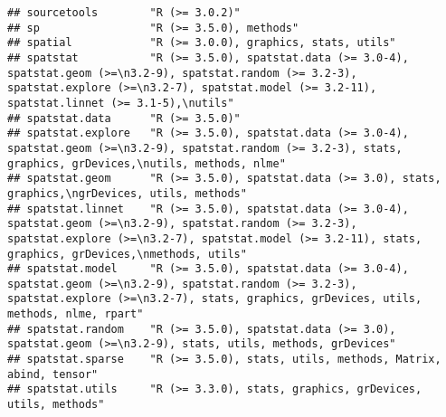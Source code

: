 \documentclass[
]{article}
\begin{document}
\begin{verbatim}
## sourcetools        "R (>= 3.0.2)"                                                                                                                                                                                        
## sp                 "R (>= 3.5.0), methods"                                                                                                                                                                               
## spatial            "R (>= 3.0.0), graphics, stats, utils"                                                                                                                                                                
## spatstat           "R (>= 3.5.0), spatstat.data (>= 3.0-4), spatstat.geom (>=\n3.2-9), spatstat.random (>= 3.2-3), spatstat.explore (>=\n3.2-7), spatstat.model (>= 3.2-11), spatstat.linnet (>= 3.1-5),\nutils"         
## spatstat.data      "R (>= 3.5.0)"                                                                                                                                                                                        
## spatstat.explore   "R (>= 3.5.0), spatstat.data (>= 3.0-4), spatstat.geom (>=\n3.2-9), spatstat.random (>= 3.2-3), stats, graphics, grDevices,\nutils, methods, nlme"                                                    
## spatstat.geom      "R (>= 3.5.0), spatstat.data (>= 3.0), stats, graphics,\ngrDevices, utils, methods"                                                                                                                   
## spatstat.linnet    "R (>= 3.5.0), spatstat.data (>= 3.0-4), spatstat.geom (>=\n3.2-9), spatstat.random (>= 3.2-3), spatstat.explore (>=\n3.2-7), spatstat.model (>= 3.2-11), stats, graphics, grDevices,\nmethods, utils"
## spatstat.model     "R (>= 3.5.0), spatstat.data (>= 3.0-4), spatstat.geom (>=\n3.2-9), spatstat.random (>= 3.2-3), spatstat.explore (>=\n3.2-7), stats, graphics, grDevices, utils, methods, nlme, rpart"                
## spatstat.random    "R (>= 3.5.0), spatstat.data (>= 3.0), spatstat.geom (>=\n3.2-9), stats, utils, methods, grDevices"                                                                                                   
## spatstat.sparse    "R (>= 3.5.0), stats, utils, methods, Matrix, abind, tensor"                                                                                                                                          
## spatstat.utils     "R (>= 3.3.0), stats, graphics, grDevices, utils, methods"                                                                                                                                            

\end{verbatim}
\end{document}
